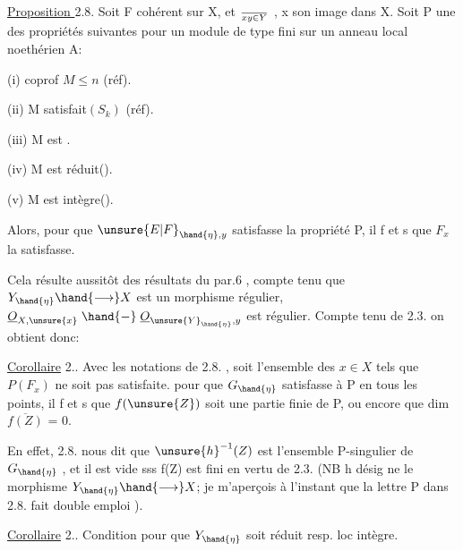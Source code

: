 
\uline{Proposition }2.8.  Soit F cohérent sur X, et  $\over{x}{y}\in Y$ , x son image
dans X.   Soit P une des propriétés suivantes pour
un module de type fini sur un anneau local noethérien A:

(i)   coprof $M\leqslant n$   (réf).

(ii)  M satisfait$(S_k)$  (réf).

(iii)  M est .

(iv)  M est réduit().

(v)   M est intègre().

Alors, pour que $\unsure{E|F}_{\hand{\eta},y}$ satisfasse la propriété P, il f et s que $F_x$ la
satisfasse.

Cela résulte aussitôt des résultats du par.6 , compte tenu que
 $Y_{\hand{\eta}}\hand{\longrightarrow} X$  est un morphisme régulier,   $\underline{O}_{X,\unsure{x}}\mathrel{\hand{-}} \underline{O}_{\unsure{Y}_{\hand{\eta}},y}$ est
régulier.  Compte tenu de 2.3. on obtient donc:

\uline{Corollaire} 2..  Avec les notations de 2.8. , soit  l'ensemble
des $x\in X$ tels que $P(F_x)$ ne soit pas satisfaite.  pour que
$G_{\hand{\eta}}$ satisfasse à P en tous les points, il f et s que $f(\unsure{Z})$ soit une
partie finie de P, ou encore que  dim $\overline{f(Z)}$ = 0.

En effet, 2.8. nous dit que $\unsure{h}^{-1}(Z)$ est l'ensemble P-singulier
de $G_{\hand{\eta}}$ , et il est vide sss f(Z) est fini en vertu de 2.3. (NB h désig
\margin{|} ne le morphisme $Y_{\hand{\eta}}\hand{\longrightarrow} X$; je m'aperçois à l'instant que la lettre P
\margin{|} dans 2.8. fait double emploi ).

\margin{|} \uline{Corollaire} 2..  Condition pour que $Y_{\hand{\eta}}$ soit réduit resp. loc intègre.



